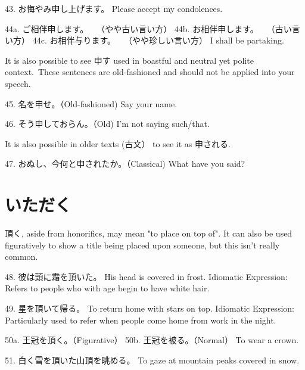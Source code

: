 \par{43. お悔やみ申し上げます。 \hfill\break
Please accept my condolences. }

\par{44a. ご相伴申します。　　（やや古い言い方） \hfill\break
44b. お相伴申します。　　（古い言い方） \hfill\break
44c. お相伴与ります。　　（やや珍しい言い方） \hfill\break
I shall be partaking. }

\par{ It is also possible to see 申す used in boastful and neutral yet polite context. These sentences are old-fashioned and should not be applied into your speech. }

\par{45. 名を申せ。（Old-fashioned) \hfill\break
Say your name. }

\par{46. そう申しておらん。（Old) \hfill\break
I'm not saying such\slash that.  }

\par{ It is also possible in older texts (古文） to see it as 申される. }

\par{47. おぬし、今何と申されたか。（Classical) \hfill\break
What have you said? }
      
\section{いただく}
 
\par{  頂く, aside from honorifics, may mean "to place on top of". It can also be used figuratively to show a title being placed upon someone, but this isn't really common. }

\par{48. 彼は頭に霜を頂いた。 \hfill\break
His head is covered in frost. \hfill\break
Idiomatic Expression: Refers to people who with age begin to have white hair. }

\par{49. 星を頂いて帰る。 \hfill\break
To return home with stars on top. \hfill\break
Idiomatic Expression: Particularly used to refer when people come home from work in the night. }

\par{50a. 王冠を頂く。（Figurative） \hfill\break
50b. 王冠を被る。（Normal） \hfill\break
To wear a crown. }

\par{51. 白く雪を頂いた山頂を眺める。 \hfill\break
To gaze at mountain peaks covered in snow. }

